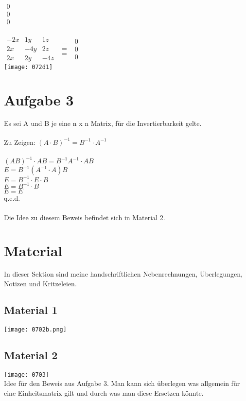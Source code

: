 \documentclass{article}
\begin{document}
	$\begin{array}{c}
	0 \\ 0 \\ 0
	\end{array}$ \\ \\
	$\begin{array}{ccc}
	-2x & 1y & 1z \\ 2x & -4y & 2z \\ 2x & 2y &-4z
	\end{array}$
	$\begin{array}{c}
	= \\ = \\ = 
	\end{array}$
	$\begin{array}{c}
	0 \\ 0 \\ 0
	\end{array}$ \\
	\texttt{[image: 072d1]}
	\section*{Aufgabe 3}
	Es sei A und B je eine n x n Matrix, für die Invertierbarkeit gelte. \\
	\\
	Zu Zeigen: $(A \cdot B)^{-1} = B^{-1} \cdot A^{-1}$ \\ \\
	$(AB)^{-1}  \cdot AB =  B^{-1}A^{-1} \cdot AB$ \\
	$E =  B^{-1}(A^{-1} \cdot A)B$ \\
	$E =  B^{-1} \cdot E \cdot B$ \\
	$E =  B^{-1} \cdot B $ \\
	$E =  E $ \\
	q.e.d. \\ \\
	Die Idee zu diesem Beweis befindet sich in Material 2.
	\section*{Material}
	In dieser Sektion sind meine handschriftlichen Nebenrechnungen, Überlegungen, Notizen und Kritzeleien.
	\subsection*{Material 1}
	\texttt{[image: 0702b.png]}
	\subsection*{Material 2}
	\texttt{[image: 0703]} \\
	Idee für den Beweis aus Aufgabe 3. Man kann sich überlegen was allgemein für eine Einheitsmatrix gilt und durch was man diese Ersetzen könnte.
\end{document}
